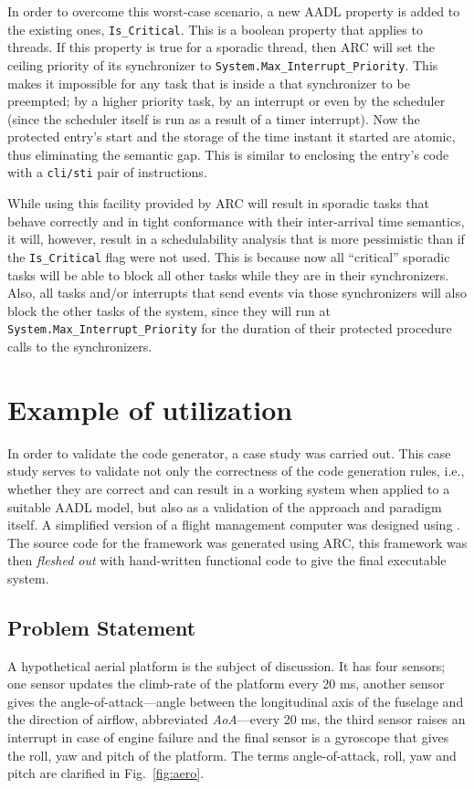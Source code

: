 In order to overcome this worst-case scenario, a new AADL property is
added to the existing ones, \texttt{Is\_Critical}. This is a boolean
property that applies to threads. If this property is true for a
sporadic thread, then ARC will set the ceiling priority of its
synchronizer to \texttt{System.Max\_Interrupt\_Priority}. This makes
it impossible for any task that is inside a that synchronizer to be
preempted; by a higher priority task, by an interrupt or even by the
scheduler (since the scheduler itself is run as a result of a timer
interrupt). Now the protected entry's start and the storage of the
time instant it started are atomic, thus eliminating the semantic
gap. This is similar to enclosing the entry's code with a
\texttt{cli/sti} pair of instructions.

While using this facility provided by ARC will result in sporadic
tasks that behave correctly and in tight conformance with their
inter-arrival time semantics, it will, however, result in a
schedulability analysis that is more pessimistic than if the
\texttt{Is\_Critical} flag were not used. This is because now all
``critical'' sporadic tasks will be able to block all other tasks
while they are in their synchronizers. Also, all tasks and/or
interrupts that send events via those synchronizers will also block
the other tasks of the system, since they will run at
\texttt{System.Max\_Interrupt\_Priority} for the duration of their
protected procedure calls to the synchronizers.

\section{Example of utilization}
\label{sec:case_study}
In order to validate the code generator, a case study was carried
out. This case study serves to validate not only the correctness of
the code generation rules, i.e., whether they are correct and can
result in a working system when applied to a suitable AADL model, but
also as a validation of the approach and paradigm itself. A simplified
version of a flight management computer was designed using \aadl. The
source code for the framework was generated using ARC, this framework
was then \emph{fleshed out} with hand-written functional code to give
the final executable system.

\subsection{Problem Statement}
A hypothetical aerial platform is the subject of discussion. It has
four sensors; one sensor updates the climb-rate of the platform every
20 ms, another sensor gives the angle-of-attack---angle between the
longitudinal axis of the fuselage and the direction of airflow,
abbreviated \emph{AoA}---every 20 ms, the third sensor raises an
interrupt in case of engine failure and the final sensor is a
gyroscope that gives the roll, yaw and pitch of the platform. The
terms angle-of-attack, roll, yaw and pitch are clarified in
Fig.~\ref{fig:aero}.

